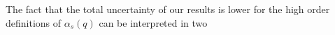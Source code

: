 The fact that the total uncertainty of our results is lower for the high order definitions of $\alpha_s(q)$ can be interpreted in two